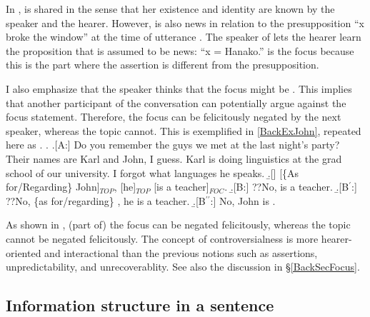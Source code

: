 In \Last[A],
 is shared in the sense that
her existence and identity are known by the speaker and the hearer.
However,
 is also news in relation to the presupposition
``x broke the window'' at the time of utterance \Last[Q].
The speaker of \Last[A] lets the hearer learn the proposition that is assumed to be news: ``x = Hanako.''
 is the focus because
this is the part where the assertion is different from the presupposition.

I also emphasize that the speaker thinks that the focus might be .
This implies that another participant of the conversation can potentially argue against the focus statement.
Therefore, the focus can be felicitously negated by the next speaker,
whereas the topic cannot.
This is exemplified in \ref{BackExJohn}, repeated here as \Next.
%
\ex. \label{BackExJohn2}\a.[A:] Do you remember the guys we met at the last night's party?
     Their names are Karl and John, I guess.
     Karl is doing linguistics at the grad school of our university.
     I forgot what languages he speaks.
     \b.[] [\{As for/Regarding\} John]$_{TOP}$, [he]$_{TOP}$ [is a teacher]$_{FOC}$.
     \b.[B:] ??No,  is a teacher.
     \b.[B$^{\prime}$:] ??No, \{as for/regarding\} , he is a teacher.
     \b.[B$^{\prime\prime}$:] No, John is .

As shown in \Last,
(part of) the focus  can be negated felicitously,
whereas the topic  cannot be negated felicitously.
The concept of controversialness is more hearer-oriented and interactional than the previous notions such as assertions, unpredictability, and unrecoverablity.
See also the discussion in \S \ref{BackSecFocus}.

\subsection{Information structure in a sentence}\label{FrameworkIS}


